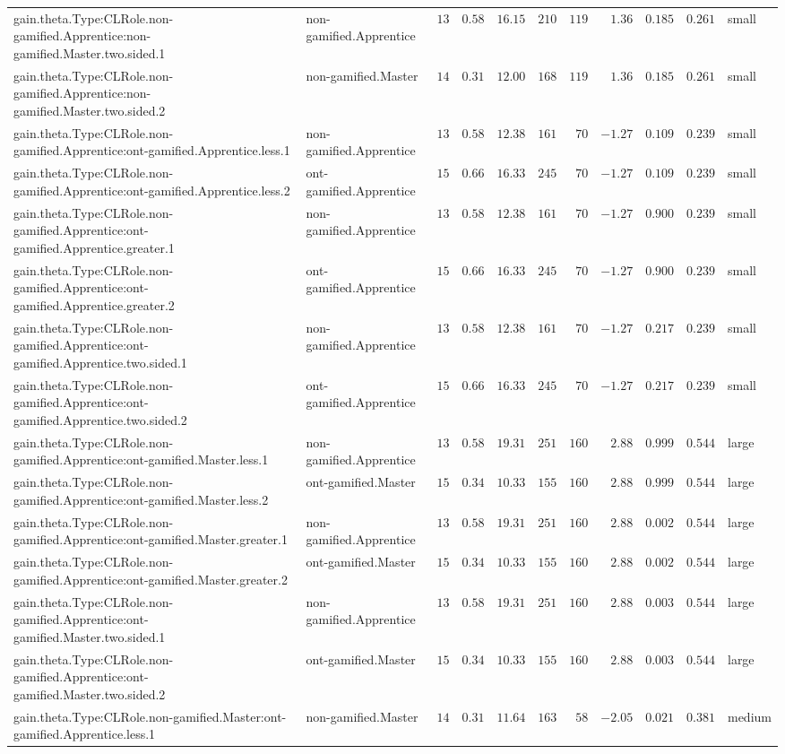 \documentclass[6pt]{article}
\begin{document}
\begin{landscape}
{\begin{longtable}{llrrrrrrrrl}
gain.theta.Type:CLRole.non-gamified.Apprentice:non-gamified.Master.two.sided.1&non-gamified.Apprentice&$13$&$0.58$&$16.15$&$210$&$119$&$ 1.36$&$0.185$&$0.261$&small\tabularnewline
gain.theta.Type:CLRole.non-gamified.Apprentice:non-gamified.Master.two.sided.2&non-gamified.Master&$14$&$0.31$&$12.00$&$168$&$119$&$ 1.36$&$0.185$&$0.261$&small\tabularnewline
gain.theta.Type:CLRole.non-gamified.Apprentice:ont-gamified.Apprentice.less.1&non-gamified.Apprentice&$13$&$0.58$&$12.38$&$161$&$ 70$&$-1.27$&$0.109$&$0.239$&small\tabularnewline
gain.theta.Type:CLRole.non-gamified.Apprentice:ont-gamified.Apprentice.less.2&ont-gamified.Apprentice&$15$&$0.66$&$16.33$&$245$&$ 70$&$-1.27$&$0.109$&$0.239$&small\tabularnewline
gain.theta.Type:CLRole.non-gamified.Apprentice:ont-gamified.Apprentice.greater.1&non-gamified.Apprentice&$13$&$0.58$&$12.38$&$161$&$ 70$&$-1.27$&$0.900$&$0.239$&small\tabularnewline
gain.theta.Type:CLRole.non-gamified.Apprentice:ont-gamified.Apprentice.greater.2&ont-gamified.Apprentice&$15$&$0.66$&$16.33$&$245$&$ 70$&$-1.27$&$0.900$&$0.239$&small\tabularnewline
gain.theta.Type:CLRole.non-gamified.Apprentice:ont-gamified.Apprentice.two.sided.1&non-gamified.Apprentice&$13$&$0.58$&$12.38$&$161$&$ 70$&$-1.27$&$0.217$&$0.239$&small\tabularnewline
gain.theta.Type:CLRole.non-gamified.Apprentice:ont-gamified.Apprentice.two.sided.2&ont-gamified.Apprentice&$15$&$0.66$&$16.33$&$245$&$ 70$&$-1.27$&$0.217$&$0.239$&small\tabularnewline
gain.theta.Type:CLRole.non-gamified.Apprentice:ont-gamified.Master.less.1&non-gamified.Apprentice&$13$&$0.58$&$19.31$&$251$&$160$&$ 2.88$&$0.999$&$0.544$&large\tabularnewline
gain.theta.Type:CLRole.non-gamified.Apprentice:ont-gamified.Master.less.2&ont-gamified.Master&$15$&$0.34$&$10.33$&$155$&$160$&$ 2.88$&$0.999$&$0.544$&large\tabularnewline
gain.theta.Type:CLRole.non-gamified.Apprentice:ont-gamified.Master.greater.1&non-gamified.Apprentice&$13$&$0.58$&$19.31$&$251$&$160$&$ 2.88$&$0.002$&$0.544$&large\tabularnewline
gain.theta.Type:CLRole.non-gamified.Apprentice:ont-gamified.Master.greater.2&ont-gamified.Master&$15$&$0.34$&$10.33$&$155$&$160$&$ 2.88$&$0.002$&$0.544$&large\tabularnewline
gain.theta.Type:CLRole.non-gamified.Apprentice:ont-gamified.Master.two.sided.1&non-gamified.Apprentice&$13$&$0.58$&$19.31$&$251$&$160$&$ 2.88$&$0.003$&$0.544$&large\tabularnewline
gain.theta.Type:CLRole.non-gamified.Apprentice:ont-gamified.Master.two.sided.2&ont-gamified.Master&$15$&$0.34$&$10.33$&$155$&$160$&$ 2.88$&$0.003$&$0.544$&large\tabularnewline
gain.theta.Type:CLRole.non-gamified.Master:ont-gamified.Apprentice.less.1&non-gamified.Master&$14$&$0.31$&$11.64$&$163$&$ 58$&$-2.05$&$0.021$&$0.381$&medium\tabularnewline

\end{longtable}}
\end{landscape}
\end{document}
